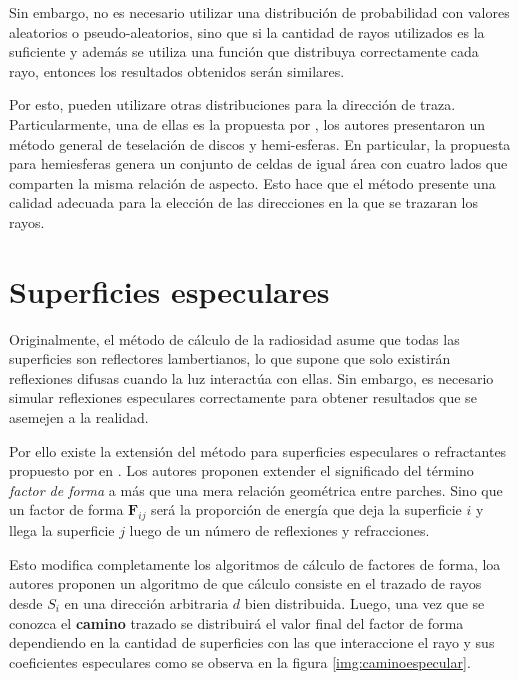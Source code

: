 Sin embargo, no es necesario utilizar una distribución de probabilidad con valores aleatorios o pseudo-aleatorios, sino que si la cantidad de rayos utilizados es la suficiente y además se utiliza una función que distribuya correctamente cada rayo, entonces los resultados obtenidos serán similares.

Por esto, pueden utilizare otras distribuciones para la dirección de traza. Particularmente, una de ellas es la propuesta por \citeauthor{Beckers}, los autores presentaron un método general de teselación de discos y hemi-esferas. En particular, la propuesta para hemiesferas genera un conjunto de celdas de igual área con cuatro lados que comparten la misma relación de aspecto. Esto hace que el método presente una calidad adecuada para la elección de las direcciones en la que se trazaran los rayos.

\section{Superficies especulares}

Originalmente, el método de cálculo de la radiosidad asume que todas las superficies son reflectores lambertianos, lo que supone que solo existirán reflexiones difusas cuando la luz interactúa con ellas. Sin embargo, es necesario simular reflexiones especulares correctamente para obtener resultados que se asemejen a la realidad.

Por ello existe la extensión del método para superficies especulares o refractantes propuesto por \citeauthor{Sillion} en \citeyear{Sillion}. Los autores proponen extender el significado del término \textit{factor de forma} a más que una mera relación geométrica entre parches. Sino que un factor de forma $\mathbf{F}_{ij}$ será la proporción de energía que deja la superficie $i$ y llega la superficie $j$ luego de un número de reflexiones y refracciones.

Esto modifica completamente los algoritmos de cálculo de factores de forma, loa autores proponen un algoritmo de  que cálculo consiste en el trazado de rayos desde $S_{i}$ en una dirección arbitraria $d$ bien distribuida.  Luego, una vez que se conozca el \textbf{camino} trazado se distribuirá el valor final del factor de forma dependiendo en la cantidad de superficies con las que interaccione el rayo y sus coeficientes especulares como se observa en la figura \ref{img:caminoespecular}.

